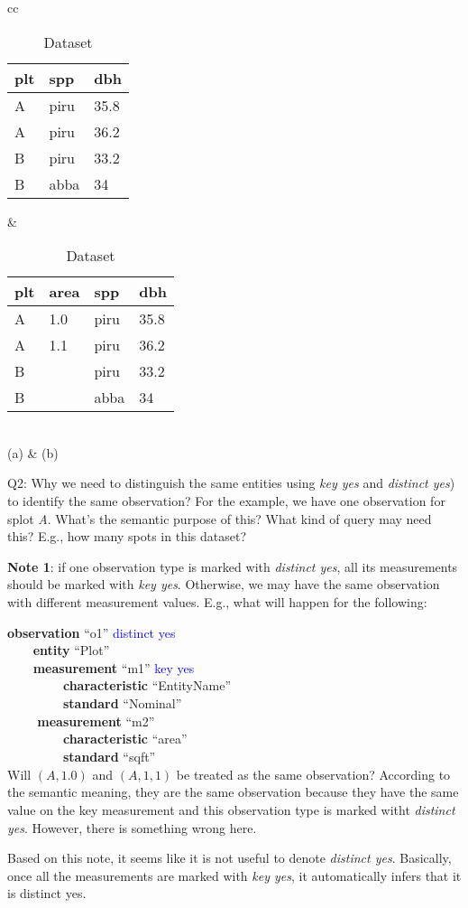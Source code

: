 \documentclass[10pt]{article}
\begin{document}
\begin{table}[htb]
\begin{center}
\begin{tabular}{cc}
\begin{tabular}{|l|l|l|}
\hline
plt & spp & dbh\\\hline
A & piru & 35.8 \\\hline
A & piru & 36.2 \\\hline
B & piru &33.2 \\\hline
B&abba&34\\\hline
\end{tabular}
&
\begin{tabular}{|l|l|l|l|}
\hline
plt & area & spp & dbh\\\hline
A & 1.0 & piru & 35.8 \\\hline
A & 1.1 & piru & 36.2 \\\hline
B & &piru &33.2 \\\hline
B& & abba&34\\\hline
\end{tabular}\\
(a) & (b)
\end{tabular}
\end{center}
\vspace{-0.2in}
\caption{Dataset}
\end{table}

Q2: Why we need to distinguish the same entities using {\em key yes} and {\em distinct yes}) to identify the same observation? 
For the example, we have one observation for splot {\em A}.
What's the semantic purpose of this? What kind of query may need this? 
E.g., how many spots in this dataset? 

{\bf Note 1}: if one observation type is marked with {\em distinct yes}, all its measurements should be marked with {\em key yes}. 
Otherwise, we may have the same observation with different measurement values. 
E.g., what will happen for the following: 

\noindent
{\bf observation} ``o1''  \textcolor{blue}{distinct yes}\\
\verb|    |{\bf  entity} ``Plot''\\
\verb|    |{\bf measurement} ``m1'' \textcolor{blue}{key yes}\\
\verb|        | {\bf characteristic} ``EntityName'' \\
\verb|        | {\bf standard} ``Nominal''\\
\verb|    | {\bf measurement} ``m2''\\
\verb|        | {\bf characteristic} ``area'' \\
\verb|        | {\bf standard} ``sqft''\\

Will $(A, 1.0)$ and $(A,1,1)$ be treated as the same observation? 
According to the semantic meaning, they are the same observation because they have the same value on the key measurement and this observation type is marked witht {\em distinct yes}. 
However, there is something wrong here. 


Based on this note, it seems like it is not useful to denote {\em distinct yes}.
Basically, once all the measurements are marked with {\em key yes}, it automatically infers that it is distinct yes. 
\end{document}
